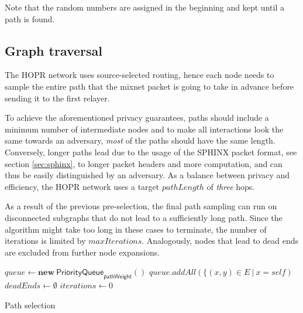 Note that the random numbers are assigned in the beginning and kept until a path is found.

\subsection{Graph traversal}
\label{sec:path-selection:graph-traversal}

The HOPR network uses source-selected routing, hence each node needs to sample the entire path that the mixnet packet is going to take in advance before sending it to the first relayer.

To achieve the aforementioned privacy guarantees, paths should include a minimum number of intermediate nodes and to make all interactions look the same towards an adversary, \textit{most} of the paths should have the same length. Conversely, longer paths lead due to the usage of the SPHINX packet format, see section \ref{sec:sphinx}, to longer packet headers and more computation, and can thus be easily distinguished by an adversary. As a balance between privacy and efficiency, the HOPR network uses a target $pathLength$ of \textit{three} hops.

As a result of the previous pre-selection, the final path sampling can run on disconnected subgraphs that do not lead to a sufficiently long path. Since the algorithm might take too long in these cases to terminate, the number of iterations is limited by ${maxIterations}$. Analogously, nodes that lead to dead ends are excluded from further node expansions.

\begin{algorithm}[H]
    \SetAlgoNoLine
    \DontPrintSemicolon
    $queue \leftarrow \mathbf{new} \ \mathsf{PriorityQueue}_{\textsf{pathWeight}}()$\;
    $queue.addAll(\{ (x,y) \in E \ | \ x = self)$\;
    $deadEnds \leftarrow \emptyset$\;
    $iterations \leftarrow 0$\;
    \;
    \caption{Path selection}
\end{algorithm}

